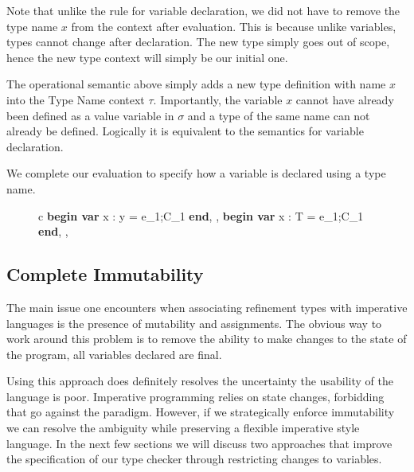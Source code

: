 \documentclass[a4paper,12pt]{report}
\begin{document}
\par
Note that unlike the rule for variable declaration, we did not have to remove 
the type name $x$ from the context after evaluation. This is because unlike 
variables, types cannot change after declaration. The new type simply goes 
out of scope, hence the new type context will simply be our initial one. 

\par
The operational semantic above simply adds a new type definition with name $x$ 
into the Type Name context $\tau$. Importantly, the variable $x$ cannot have 
already been defined as a value variable in $\sigma$ and a type of the same name 
can not already be defined. Logically it is equivalent to the semantics for 
variable declaration.

\par
We complete our evaluation to specify how a variable is declared using a type 
name. 

\begin{figure}[H]
  \begin{center}
    \begin{tabular} {c}
      {\langle\textbf{begin var }x : y = e_1;C_1\textbf{ end}, \sigma, \tau \rangle 
      \longrightarrow \langle\textbf{begin var }x : T = e_1;C_1\textbf{ end}, \sigma, \tau \rangle }
    \end{tabular}
  \end{center}
\end{figure}

\subsection{Complete Immutability}
The main issue one encounters when associating refinement types with imperative 
languages is the presence of mutability and assignments. The obvious way to 
work around this problem is to remove the ability to make changes to the state 
of the program, all variables declared are final.

\par
Using this approach does definitely resolves the uncertainty the usability of 
the language is poor. Imperative programming relies on state changes, forbidding 
that go against the paradigm. However, if we strategically enforce immutability 
we can resolve the ambiguity while preserving a flexible imperative style 
language. In the next few sections we will discuss two approaches that 
improve the specification of our type checker through restricting changes to 
variables. 
\end{document}
